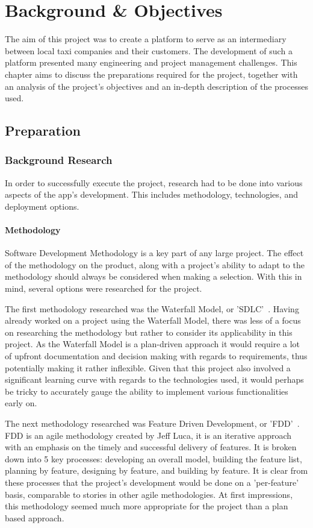 \chapter{Background \& Objectives}
The aim of this project was to create a platform to serve as an intermediary between local taxi companies and their customers. The development of such a platform presented many engineering and project management challenges. This chapter aims to discuss the preparations required for the project, together with an analysis of the project's objectives and an in-depth description of the processes used.

\section{Preparation}\label{ref_background}
\subsection{Background Research}\label{ref_background_research}
In order to successfully execute the project, research had to be done into various aspects of the app's development. This includes methodology, technologies, and deployment options.

\subsubsection{Methodology}\label{methodology_research_ref}
Software Development Methodology is a key part of any large project. The effect of the methodology on the product, along with a project's ability to adapt to the methodology should always be considered when making a selection. With this in mind, several options were researched for the project.

The first methodology researched was the Waterfall Model, or 'SDLC'~\cite{sdlc_ref}. Having already worked on a project using the Waterfall Model, there was less of a focus on researching the methodology but rather to consider its applicability in this project. As the Waterfall Model is a plan-driven approach it would require a lot of upfront documentation and decision making with regards to requirements, thus potentially making it rather inflexible. Given that this project also involved a significant learning curve with regards to the technologies used, it would perhaps be tricky to accurately gauge the ability to implement various functionalities early on.

The next methodology researched was Feature Driven Development, or 'FDD'~\cite{fdd_practical_guide_ref}. FDD is an agile methodology created by Jeff Luca, it is an iterative approach with an emphasis on the timely and successful delivery of features. It is broken down into 5 key processes: developing an overall model, building the feature list, planning by feature, designing by feature, and building by feature. It is clear from these processes that the project's development would be done on a 'per-feature' basis, comparable to stories in other agile methodologies. At first impressions, this methodology seemed much more appropriate for the project than a plan based approach.


